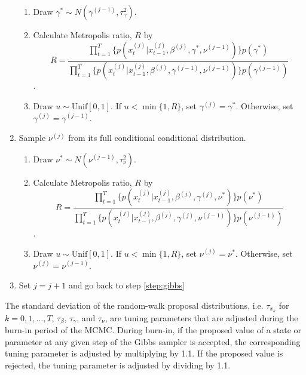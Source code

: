 \documentclass{article}
\begin{document}
\begin{enumerate}
    \begin{enumerate}[label=\alph*.,leftmargin=1.75\parindent]
    \item Draw $\gamma^* \sim N(\gamma^{(j-1)},\tau^2_{\gamma})$.
    \item Calculate Metropolis ratio, $R$ by
    \[R = \frac{\prod_{t=1}^T \{p(x^{(j)}_t|x^{(j)}_{t-1},\beta^{(j)},\gamma^*,\nu^{(j-1)})\}p(\gamma^*)}{\prod_{t=1}^T \{p(x^{(j)}_t|x^{(j)}_{t-1},\beta^{(j)},\gamma^{(j-1)},\nu^{(j-1)})\}p(\gamma^{(j-1)})}\].
    \item Draw $u \sim \mbox{Unif}[0,1]$. If $u < \min\{1, R\}$, set $\gamma^{(j)} = \gamma^*$. Otherwise, set $\gamma^{(j)} = \gamma^{(j-1)}$.
    \end{enumerate}
\item Sample $\nu^{(j)}$ from its full conditional conditional distribution.
    \begin{enumerate}[label=\alph*.,leftmargin=1.75\parindent]
    \item Draw $\nu^* \sim N(\nu^{(j-1)},\tau^2_{\nu})$.
    \item Calculate Metropolis ratio, $R$ by
    \[R = \frac{\prod_{t=1}^T \{p(x^{(j)}_t|x^{(j)}_{t-1},\beta^{(j)},\gamma^{(j)},\nu^*)\}p(\nu^*)}{\prod_{t=1}^T \{p(x^{(j)}_t|x^{(j)}_{t-1},\beta^{(j)},\gamma^{(j)},\nu^{(j-1)})\}p(\nu^{(j-1)})}\].
    \item Draw $u \sim \mbox{Unif}[0,1]$. If $u < \min\{1, R\}$, set $\nu^{(j)} = \nu^*$. Otherwise, set $\nu^{(j)} = \nu^{(j-1)}$.
    \end{enumerate}
\item Set $j = j + 1$ and go back to step \ref{step:gibbs}
\end{enumerate}

\noindent The standard deviation of the random-walk proposal distributions, i.e. $\tau_{x_k}$ for $k = 0,1,\ldots,T$, $\tau_{\beta}$, $\tau_{\gamma}$, and $\tau_{\nu}$, are tuning parameters that are adjusted during the burn-in period of the MCMC. During burn-in, if the proposed value of a state or parameter at any given step of the Gibbs sampler is accepted, the corresponding tuning parameter is adjusted by multiplying by 1.1. If the proposed value is rejected, the tuning parameter is adjusted by dividing by 1.1.
\end{document}
